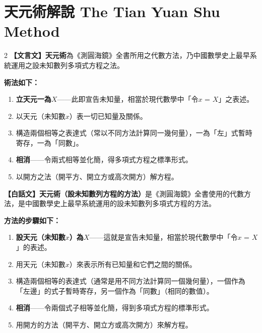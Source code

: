 \documentclass[11pt,a4paper]{article}
\begin{document}
\section{天元術解說 The Tian Yuan Shu Method}
\label{sec:tianyuan}

\begin{paracol}{2}
\textbf{【文言文】}\textbf{天元術}為《測圓海鏡》全書所用之代數方法，乃中國數學史上最早系統運用之設未知數列多項式方程之法。

\textbf{術法如下：}

\begin{enumerate}[leftmargin=1.5em]
\item \textbf{立天元一為$X$}——此即宣告未知量，相當於現代數學中「令$x$ = $X$」之表述。
\item 以天元（未知數$x$）表一切已知量及關係。
\item 構造兩個相等之表達式（常以不同方法計算同一幾何量），一為「左」式暫時寄存，一為「同數」。
\item \textbf{相消}——令兩式相等並化簡，得多項式方程之標準形式。
\item 以開方之法（開平方、開立方或高次開方）解方程。
\end{enumerate}

\switchcolumn
\textbf{【白話文】}\textbf{天元術（設未知數列方程的方法）}是《測圓海鏡》全書使用的代數方法，是中國數學史上最早系統運用的設未知數列多項式方程的方法。

\textbf{方法的步驟如下：}

\begin{enumerate}[leftmargin=1.5em]
\item \textbf{設天元（未知數$x$）為$X$}——這就是宣告未知量，相當於現代數學中「令$x$ = $X$」的表述。
\item 用天元（未知數$x$）來表示所有已知量和它們之間的關係。
\item 構造兩個相等的表達式（通常是用不同方法計算同一個幾何量），一個作為「左邊」的式子暫時寄存，另一個作為「同數」（相同的數值）。
\item \textbf{相消}——令兩個式子相等並化簡，得到多項式方程的標準形式。
\item 用開方的方法（開平方、開立方或高次開方）來解方程。
\end{enumerate}
\end{paracol}

\vspace{0.5cm}
\end{document}
